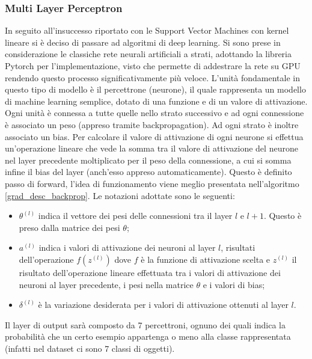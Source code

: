 \subsubsection{Multi Layer Perceptron}
In seguito all'insuccesso riportato con le Support Vector Machines con kernel lineare si è deciso di passare ad algoritmi di deep learning. Si sono prese in considerazione le classiche rete neurali artificiali a strati, adottando la libreria Pytorch per l'implementazione, visto che permette di addestrare la rete su GPU rendendo questo processo significativamente più veloce.
L'unità fondamentale in questo tipo di modello è il percettrone (neurone), il quale rappresenta un modello di machine learning semplice, dotato di una funzione e di un valore di attivazione. Ogni unità è connessa a tutte quelle nello strato successivo e ad ogni connessione è associato un peso (appreso tramite backpropagation). Ad ogni strato è inoltre associato un bias. Per calcolare il valore di attivazione di ogni neurone si effettua un'operazione lineare che vede la somma tra il valore di attivazione del neurone nel layer precedente moltiplicato per il peso della connessione, a cui si somma infine il bias del layer (anch'esso appreso automaticamente). Questo è definito passo di forward, l'idea di funzionamento viene meglio presentata nell'algoritmo \ref*{grad_desc_backprop}. Le notazioni adottate sono le seguenti:
\begin{itemize}
    \item $\theta^{(l)}$ indica il vettore dei pesi delle connessioni tra il layer $l$ e $l+1$. Questo è preso dalla matrice dei pesi $\theta$;
    \item $a^{(l)}$ indica i valori di attivazione dei neuroni al layer $l$, risultati dell'operazione $f(z^{(l)})$ dove $f$ è la funzione di attivazione scelta e $z^{(l)}$ il risultato dell'operazione lineare effettuata tra i valori di attivazione dei neuroni al layer precedente, i pesi nella matrice $\theta$ e i valori di bias;
    \item $\delta^{(l)}$ è la variazione desiderata per i valori di attivazione ottenuti al layer $l$.
\end{itemize}
Il layer di output sarà composto da 7 percettroni, ognuno dei quali indica la probabilità che un certo esempio appartenga o meno alla classe rappresentata (infatti nel dataset ci sono 7 classi di oggetti).

